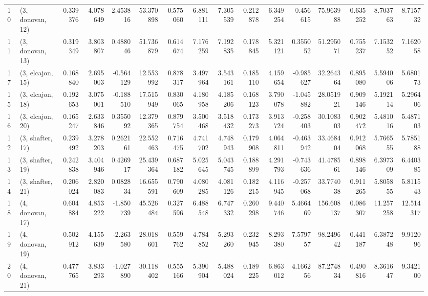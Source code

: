 \begin{tabular}{llrrrrrrrrrrrrrr}
10 &  (3, donovan, 12) &   0.339376 &  4.078649 &  2.453816 &  53.370898 &  0.575060 &   6.881111 &  7.305539 &  0.212878 &   6.349254 & -0.456615 &   75.963988 &  0.635252 &   8.703763 &   8.715732 \\
11 &  (3, donovan, 13) &   0.319349 &  3.803807 &  0.488046 &  51.736879 &  0.614674 &   7.176259 &  7.192835 &  0.178845 &   5.321121 &  0.355052 &   51.295071 &  0.755237 &   7.153252 &   7.162058 \\
17 &  (3, elcajon, 15) &   0.168840 &  2.695003 & -0.564129 &  12.553992 &  0.878317 &   3.497964 &  3.543161 &  0.185110 &   4.159654 & -0.985627 &   32.264364 &  0.895080 &   5.594006 &   5.680173 \\
15 &  (3, elcajon, 18) &   0.192653 &  3.075001 & -0.188510 &  17.515949 &  0.830065 &   4.180958 &  4.185206 &  0.168123 &   3.790078 & -1.045882 &   28.051921 &  0.909146 &   5.192114 &   5.296406 \\
16 &  (3, elcajon, 20) &   0.165247 &  2.633846 &  0.355092 &  12.379365 &  0.879754 &   3.500468 &  3.518432 &  0.173273 &   3.913724 & -0.258403 &   30.108303 &  0.902472 &   5.481016 &   5.487103 \\
12 &  (3, shafter, 17) &   0.239492 &  3.278203 &  0.262161 &  22.552463 &  0.716475 &   4.741702 &  4.748943 &  0.179908 &   4.064811 & -0.463942 &   33.468404 &  0.912068 &   5.766555 &   5.785188 \\
13 &  (3, shafter, 19) &   0.242838 &  3.404946 &  0.426917 &  25.439364 &  0.687182 &   5.025645 &  5.043745 &  0.188899 &   4.291793 & -0.743636 &   41.478561 &  0.898146 &   6.397309 &   6.440385 \\
14 &  (3, shafter, 21) &   0.206024 &  2.820083 &  0.082834 &  16.655591 &  0.790609 &   4.080285 &  4.081126 &  0.182215 &   4.116945 & -0.257068 &   33.774038 &  0.911265 &   5.805855 &   5.811543 \\
18 &  (4, donovan, 17) &   0.604884 &  4.853222 & -1.850739 &  45.526484 &  0.327596 &   6.488548 &  6.747332 &  0.260298 &   9.440746 &  5.466469 &  156.608137 &  0.086307 &  11.257258 &  12.514317 \\
19 &  (4, donovan, 19) &   0.502912 &  4.155639 & -2.263580 &  28.018601 &  0.559762 &   4.784852 &  5.293260 &  0.232945 &   8.293380 &  7.579757 &   98.249642 &  0.441187 &   6.387248 &   9.912096 \\
20 &  (4, donovan, 21) &   0.477765 &  3.833293 & -1.027890 &  30.118402 &  0.555166 &   5.390904 &  5.488024 &  0.189225 &   6.863012 &  4.166256 &   87.274834 &  0.490816 &   8.361647 &   9.342100 \\

\end{tabular}
